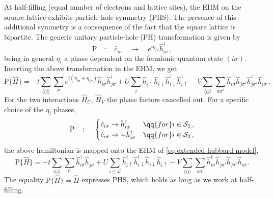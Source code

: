 At half-filling (equal number of electrons and lattice sites), the EHM on the square lattice exhibits particle-hole symmetry (PHS). The presence of this additional symmetry is a consequence of the fact that the square lattice is bipartite. The generic unitary particle-hole (PH) transformation is given by
\begin{equation}\label{eq:phs-P-general}
	\mathrm{P}
	\quad\colon\quad
	\hat c_{i\sigma}
	\quad\to\quad
	e^{i\eta_{i\sigma}} \hat h_{i\sigma}^\dagger \, ,
\end{equation}
being in general $\eta_i$ a phase dependent on the fermionic quantum state $(i\sigma)$. Inserting the above transformation in the EHM, we get
\[
	\mathrm{P} \lbrace \hat H \rbrace =
	-t \sum_{\langle ij \rangle} \sum_\sigma e^{i(\eta_{i\sigma} + \eta_{j\sigma})} \hat h_{i\sigma} \hat h_{j\sigma}^\dagger
	+U \sum_i \hat h_{i\uparrow} \hat h_{i\downarrow} \hat h_{i\downarrow}^\dagger \hat h_{i\uparrow}^\dagger
	- V \sum_{\langle ij \rangle} \sum_{\sigma \sigma'} \hat h_{i\sigma} \hat h_{j\sigma'} \hat h_{j\sigma'}^\dagger \hat h_{i\sigma}^\dagger \, .
\]
For the two interactions $\hat H_U$, $\hat H_V$ the phase factors cancelled out. For a specific choice of the $\eta_i$ phases, 
\begin{equation}\label{eq:phs}
	\mathrm{P}
	\quad\colon\quad
	\begin{cases}
		\hat c_{i\sigma} \to \hat h_{i\sigma}^\dagger
		&\qq{for}
		i \in \mathcal{S}_1 \, , \\
		\hat c_{i\sigma} \to -\hat h_{i\sigma}^\dagger
		&\qq{for}
		i \in \mathcal{S}_2 \, ,
	\end{cases}
\end{equation}
the above hamiltonian is mapped onto the EHM of \eqref{eq:extended-hubbard-model},
\[
	\mathrm{P} \lbrace \hat H \rbrace =
	-t \sum_{\langle ij \rangle} \sum_\sigma \hat h_{i\sigma}^\dagger \hat h_{j\sigma}
	+U \sum_{i\in\mathcal{L}} \hat h_{i\uparrow}^\dagger \hat h_{i\downarrow}^\dagger \hat h_{i\downarrow} \hat h_{i\uparrow}
	- V \sum_{\langle ij \rangle} \sum_{\sigma \sigma'} \hat h_{i\sigma}^\dagger \hat h_{j\sigma'} \hat h_{j\sigma'} \hat h_{i\sigma} \, .
\]
The equality $\mathrm{P} \lbrace \hat H \rbrace = \hat H$ expresses PHS, which holds as long as we work at half-filling.

